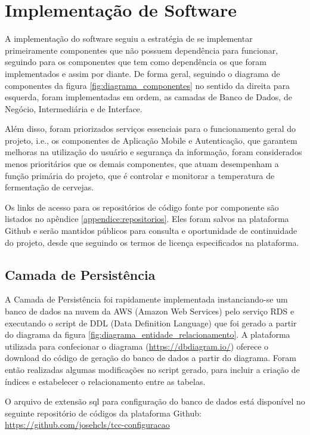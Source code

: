 \section{Implementação de Software}

A implementação do software seguiu a estratégia de se implementar primeiramente componentes que não possuem dependência para funcionar, seguindo para os componentes que tem como dependência os que foram implementados e assim por diante. De forma geral, seguindo o diagrama de componentes da figura \ref{fig:diagrama_componentes} no sentido da direita para esquerda, foram implementadas em ordem, as camadas de Banco de Dados, de Negócio, Intermediária e de Interface. 


Além disso, foram priorizados serviços essenciais para o funcionamento geral do projeto, i.e., os componentes de Aplicação Mobile e Autenticação, que garantem melhoras na utilização do usuário e segurança da informação, foram considerados menos prioritários que os demais componentes, que atuam desempenham a função primária do projeto, que é controlar e monitorar a temperatura de fermentação de cervejas.


Os links de acesso para os repositórios de código fonte por componente são listados no apêndice \ref{appendice:repositorios}. Eles foram salvos na plataforma Github e serão mantidos públicos para consulta e oportunidade de continuidade do projeto, desde que seguindo os termos de licença especificados na plataforma.


\subsection{Camada de Persistência}


A Camada de Persistência foi rapidamente implementada instanciando-se um banco de dados na nuvem da AWS (Amazon Web Services) pelo serviço RDS e executando o script de DDL (Data Definition Language) que foi gerado a partir do diagrama da figura \ref{fig:diagrama_entidade_relacionamento}. A plataforma utilizada para confecionar o diagrama (\url{https://dbdiagram.io/}) oferece o download do código de geração do banco de dados a partir do diagrama. Foram então realizadas algumas modificações no script gerado, para incluir a criação de índices e estabelecer o relacionamento entre as tabelas.  


    O arquivo de extensão sql para configuração do banco de dados está disponível no seguinte repositório de códigos da plataforma Github: \url{https://github.com/josehcls/tcc-configuracao}


